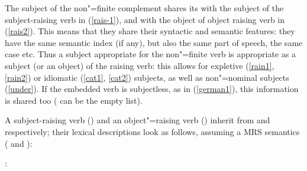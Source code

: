 The subject of the non"=finite complement shares its  with the subject of
the subject-raising verb in (\ref{rais-1}), and with the object of object raising verb in
(\ref{rais2}). This means that they share their syntactic and semantic features: they have the same
semantic index (if any), but also the same part of speech, the same case etc. Thus a subject
appropriate for the non"=finite verb is appropriate as a subject (or an object) of the raising verb:
this allows for expletive (\ref{rain1}, \ref{rain2}) or idiomatic (\ref{cat1}, \ref{cat2}) subjects,
as well as non"=nominal subjects (\ref{under}). If the embedded verb is subjectless, as in
(\ref{german1}), this information is shared too ( can be the empty list). 

A subject-raising verb () and an object"=raising verb () inherit from
 and  respectively; their lexical descriptions look as follows,
assuming a MRS semantics (\citealp{CFPS2005a} and ):

\eas
{}:\\
\zs

